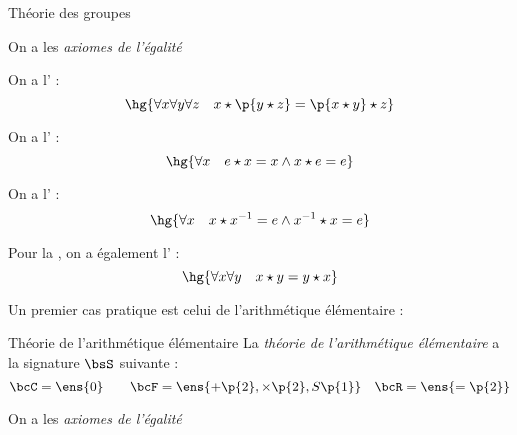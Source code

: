     \begin{example}{Théorie des groupes}{}
        \begin{enumerate}
            \itt On a les \textit{axiomes de l'égalité}
            
            \itt On a l' :
            \[ \hg{ \forall x \forall y \forall z \quad x \star \p{y \star z} = \p{x \star y} \star z} \]
            
            \itt On a l' :
            \[ \hg{\forall x \quad e \star x = x \land x \star e = e} \]
            
            \itt On a l' :
            \[ \hg{\forall x \quad x \star x^{-1} = e \land x^{-1} \star x = e} \]
        
            \itt Pour la , on a également l' :
            \[ \hg{\forall x \forall y \quad x \star y = y \star x} \]
            
        \end{enumerate}
    \end{example}
    
    Un premier cas pratique est celui de l'arithmétique élémentaire :
    
    \begin{example}{Théorie de l'arithmétique élémentaire}{}
        La \textit{théorie de l'arithmétique élémentaire} a la signature $\bsS$ suivante :
        \[ \bcC = \ens{0}\qquad \bcF = \ens{+ \p{2}, \times \p{2}, S\p{1}}\quad \bcR = \ens{= \p{2}}\]
        \begin{enumerate}
            \begin{minipage}{0.5\linewidth}
                \itt On a les \textit{axiomes de l'égalité}
            
                \itt {}
            
                \itt {}
            
                \itt {}
            \end{minipage}
            \begin{minipage}{0.5\linewidth}
                \itt {}
            
                \itt {}
             
                \itt {}
        
                \itt {}
            \end{minipage}
            
        \end{enumerate}
    \end{example}
    
